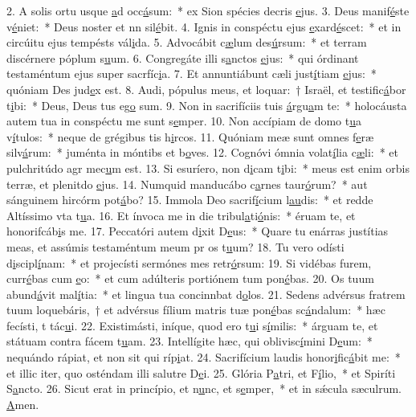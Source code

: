 2. A solis ortu usque \uline{a}d occ\uline{á}sum:~* ex Sion spécies decris \uline{e}jus.
3. Deus manif\uline{é}ste v\uline{é}niet:~* Deus noster et nn sil\uline{é}bit.
4. Ignis in conspéctu ejus \uline{e}xard\uline{é}scet:~* et in circúitu ejus tempésts vál\uline{i}da.
5. Advocábit c\uline{æ}lum des\uline{ú}rsum:~* et terram discérnere póplum s\uline{u}um.
6. Congregáte illi s\uline{a}nctos \uline{e}jus:~* qui órdinant testaméntum ejus super sacrfíc\uline{i}a.
7. Et annuntiábunt cæli just\uline{í}tiam \uline{e}jus:~* quóniam Des jud\uline{e}x est.
8. Audi, pópulus meus, et loquar:~† Israël, et testific\uline{á}bor t\uline{i}bi:~* Deus, Deus tus eg\uline{o} sum.
9. Non in sacrifíciis tuis \uline{á}rgu\uline{a}m te:~* holocáusta autem tua in conspéctu me sunt s\uline{e}mper.
10. Non accípiam de domo t\uline{u}a v\uline{í}tulos:~* neque de grégibus tis h\uline{i}rcos.
11. Quóniam meæ sunt omnes f\uline{e}ræ silv\uline{á}rum:~* juménta in móntibs et b\uline{o}ves.
12. Cognóvi ómnia volat\uline{í}lia c\uline{æ}li:~* et pulchritúdo agr mec\uline{u}m est.
13. Si esuríero, non d\uline{i}cam t\uline{i}bi:~* meus est enim orbis terræ, et plenitdo \uline{e}jus.
14. Numquid manducábo c\uline{a}rnes taur\uline{ó}rum?~* aut sánguinem hircórm pot\uline{á}bo?
15. Immola Deo sacrif\uline{í}cium l\uline{au}dis:~* et redde Altíssimo vta t\uline{u}a.
16. Et ínvoca me in die tribul\uline{a}ti\uline{ó}nis:~* éruam te, et honorifcáb\uline{i}s me.
17. Peccatóri autem d\uline{i}xit D\uline{e}us:~* Quare tu enárras justítias meas, et assúmis testaméntum meum pr os t\uline{u}um?
18. Tu vero odísti d\uline{i}scipl\uline{í}nam:~* et projecísti sermónes mes retr\uline{ó}rsum:
19. Si vidébas furem, curr\uline{é}bas cum \uline{e}o:~* et cum adúlteris portiónem tum pon\uline{é}bas.
20. Os tuum abund\uline{á}vit mal\uline{í}tia:~* et lingua tua concinnbat d\uline{o}los.
21. Sedens advérsus fratrem tuum loquebáris,~† et advérsus fílium matris tuæ pon\uline{é}bas sc\uline{á}ndalum:~* hæc fecísti, t tác\uline{u}i.
22. Existimásti, iníque, quod ero t\uline{u}i s\uline{í}milis:~* árguam te, et státuam contra fácem t\uline{u}am.
23. Intellígite hæc, qui oblivisc\uline{í}mini D\uline{e}um:~* nequándo rápiat, et non sit qui ríp\uline{i}at.
24. Sacrifícium laudis honor\uline{i}fic\uline{á}bit me:~* et illic iter, quo osténdam illi salutre D\uline{e}i.
25. Glória P\uline{a}tri, et F\uline{í}lio,~* et Spiríti S\uline{a}ncto.
26. Sicut erat in princípio, et n\uline{u}nc, et s\uline{e}mper,~* et in sǽcula sæculrum. \uline{A}men.

